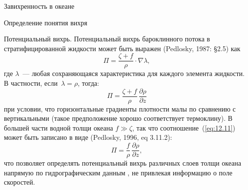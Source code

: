 \begin{chapter}{Завихренность в океане}
\begin{section}{Определение понятия вихря}
\begin{paragraph}{Потенциальный вихрь.}
Потенциальный вихрь бароклинного потока в стратифицированной 
жидкости может быть выражен (Pedlosky, 1987: \S 2.5) как
\begin{equation}
 \Pi = \frac{\zeta + f}{\rho} \cdot \nabla \lambda,
\end{equation}
где $\lambda$~--- любая сохраняющаяся характеристика для каждого элемента
жидкости. В частности, если~$\lambda = \rho$, тогда:
\begin{equation}\label{eq:12.11}
 \Pi = \frac{\zeta + f}{\rho}\,\frac{\partial{\rho}}{\partial{z}}
\end{equation}
при условии, что горизонтальные градиенты плотности малы по сравнению с
вертикальными (такое предположение хорошо соответствует 
термоклину).
В большей части водной толщи океана $f \gg \zeta$, так что 
соотношение~(\ref{eq:12.11}) может быть записано в виде
(Pedlosky, 1996, eq 3.11.2):
\begin{equation}
 \Pi = \frac{f}{\rho}\,\frac{\partial{\rho}}{\partial{z}},
\end{equation}
что позволяет определять потенциальный вихрь различных слоев толщи океана 
напрямую по гидрографическим данным%
, не привлекая информацию 
о поле скоростей.
%
\end{paragraph}
\end{section}


\end{chapter}
